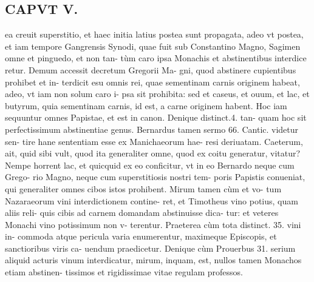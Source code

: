 \documentclass{article}
\begin{document}
\begin{pages}
\section*{CAPVT  V. }
\marginpar{[ p.879 ]}\pstart ea creuit superstitio, et haec initia latius postea sunt propagata, adeo vt postea, et iam tempore Gangrensis Synodi, quae fuit sub Constantino Magno, Sagimen omne et pinguedo, et non tan- tùm caro ipsa Monachis et abstinentibus interdice retur. Demum accessit decretum Gregorii Ma- gni, quod abstinere cupientibus prohibet et in- terdicit esu omnis rei, quae sementinam carnis originem habeat, adeo, vt iam non solum caro i- psa sit prohibita: sed et caseus, et ouum, et lac, et butyrum, quia sementinam carnis, id est, a carne originem habent. Hoc iam sequuntur omnes Papistae, et est in canon. Denique distinct.4. tan- quam hoc sit perfectissimum abstinentiae genus. Bernardus tamen sermo 66. Cantic. videtur sen- tire hane sententiam esse ex Manichaeorum hae- resi deriuatam. Caeterum, ait, quid sibi vult, quod ita generaliter omne, quod ex coitu generatur, vitatur? Nempe horrent lac, et quicquid ex eo conficitur, vt in eo Bernardo neque cum Grego- rio Magno, neque cum superstitiosis nostri tem- poris Papistis conueniat, qui generaliter omnes cibos istos prohibent. Mirum tamen cùm et vo- tum Nazaraeorum vini interdictionem contine- ret, et Timotheus vino potius, quam aliis reli- quis cibis ad carnem domandam abstinuisse dica- tur: et veteres Monachi vino potissimum non v- terentur. Praeterea cùm tota distinct. 35. vini in- commoda atque pericula varia enumerentur, maximeque Episcopis, et sanctioribus viris ca- uendum praedicetur. Denique cùm Prouerbus 31. serium aliquid acturis vinum interdicatur, mirum, inquam, est, nullos tamen Monachos etiam abstinen- tissimos et rigidissimae vitae regulam professos.  \pend

\end{pages}
\end{document}
